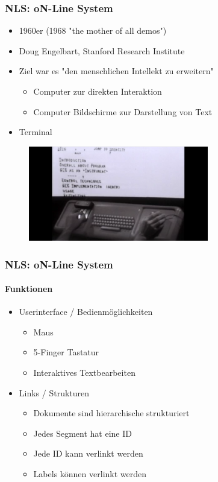 \begin{frame}
\frametitle{NLS: oN-Line System}
\begin{itemize}
	\item 1960er (1968 "the mother of all demos")
	\item Doug Engelbart, Stanford Research Institute
	\item Ziel war es "den menschlichen Intellekt zu erweitern"
	\begin{itemize}
		\item Computer zur direkten Interaktion
		\item Computer Bildschirme zur Darstellung von Text
	\end{itemize}
	\item Terminal
\end{itemize}

\begin{figure}[htbp]
	\centering
	\includegraphics[width=0.7\textwidth]{images/nls}
\end{figure}

\end{frame}

\begin{frame}
\frametitle{NLS: oN-Line System}
\framesubtitle{Funktionen}
	\begin{itemize}
		\item Userinterface / Bedienmöglichkeiten
		\begin{itemize}
			\item Maus
			\item 5-Finger Tastatur
			\item Interaktives Textbearbeiten
		\end{itemize}
		\item Links / Strukturen
		\begin{itemize}
			\item Dokumente sind hierarchische strukturiert
			\item Jedes Segment hat eine ID
			\item Jede ID kann verlinkt werden
			\item Labels können verlinkt werden
		\end{itemize}
	\end{itemize}
\end{frame}
